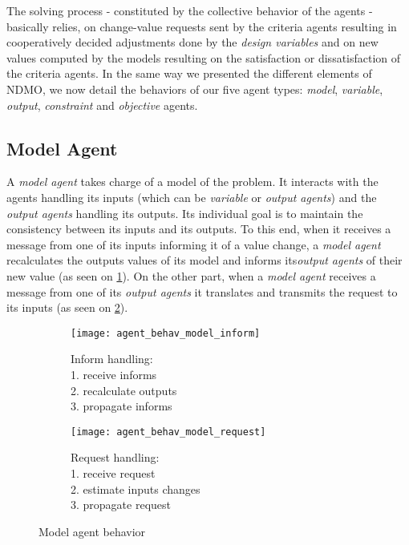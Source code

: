 The solving process - constituted by the collective behavior of the agents - basically relies, on change-value requests sent by the criteria agents resulting in cooperatively decided adjustments done by the \emph{design variables} and on new values computed by the models resulting on the satisfaction or dissatisfaction of the criteria agents. 
In the same way we presented the different elements of NDMO, we now detail the behaviors of our five agent types: \emph{model}, \emph{variable}, \emph{output}, \emph{constraint} and \emph{objective} agents.

\subsection{Model Agent}

A \emph{model agent} takes charge of a model of the problem. It interacts with the agents handling its inputs (which can be \emph{variable} or \emph{output agents}) and the \emph{output agents} handling its outputs. Its individual goal is to maintain the consistency between its inputs and its outputs. To this end, when it receives a message from one of its inputs informing it of a value change, a \emph{model agent} recalculates the outputs values of its model and informs its\emph{output agents} of their new value (as seen on \figurename{} \ref{agent_behav_model:inf}). On the other part, when a \emph{model agent} receives a message from one of its \emph{output agents} it translates and transmits the request to its inputs (as seen on \figurename{} \ref{agent_behav_model:req}). 

\begin{figure}
\centering
\begin{subfigure}{0.35\textwidth}
		\centering
		\texttt{[image: agent\_behav\_model\_inform]}
		\caption{Inform handling:\\1. receive informs\\2. recalculate outputs\\3. propagate informs}\label{agent_behav_model:inf}
\end{subfigure}
\qquad
\begin{subfigure}{0.35\textwidth}
		\centering
		\texttt{[image: agent\_behav\_model\_request]}
		\caption{Request handling:\\1. receive request\\2. estimate inputs changes\\3. propagate request}\label{agent_behav_model:req}
\end{subfigure}
\caption{Model agent behavior}\label{agent_behav_model}
\end{figure}

